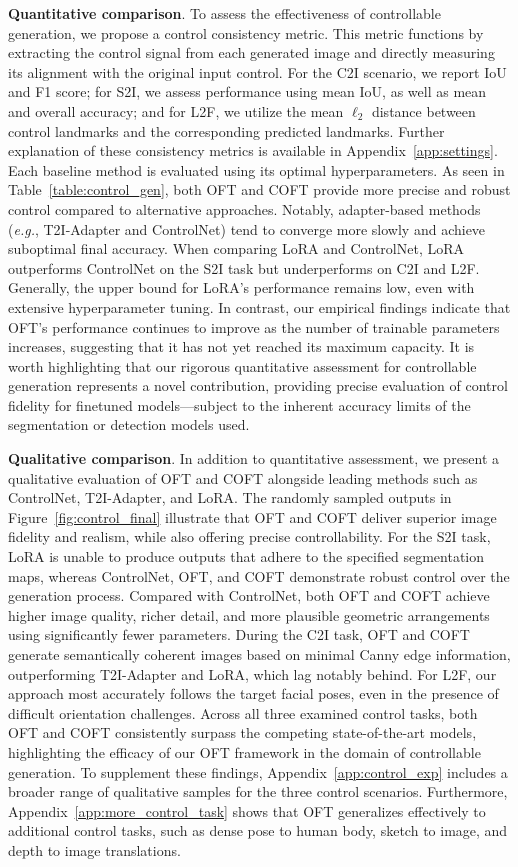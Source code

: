 {\textbf{Quantitative comparison}. To assess the effectiveness of controllable generation, we propose a control consistency metric. This metric functions by extracting the control signal from each generated image and directly measuring its alignment with the original input control. For the C2I scenario, we report IoU and F1 score; for S2I, we assess performance using mean IoU, as well as mean and overall accuracy; and for L2F, we utilize the mean $\ell_2$ distance between control landmarks and the corresponding predicted landmarks. Further explanation of these consistency metrics is available in Appendix~\ref{app:settings}. Each baseline method is evaluated using its optimal hyperparameters. As seen in Table~\ref{table:control_gen}, both OFT and COFT provide more precise and robust control compared to alternative approaches. Notably, adapter-based methods (\emph{e.g.}, T2I-Adapter and ControlNet) tend to converge more slowly and achieve suboptimal final accuracy. When comparing LoRA and ControlNet, LoRA outperforms ControlNet on the S2I task but underperforms on C2I and L2F. Generally, the upper bound for LoRA’s performance remains low, even with extensive hyperparameter tuning. In contrast, our empirical findings indicate that OFT’s performance continues to improve as the number of trainable parameters increases, suggesting that it has not yet reached its maximum capacity. It is worth highlighting that our rigorous quantitative assessment for controllable generation represents a novel contribution, providing precise evaluation of control fidelity for finetuned models—subject to the inherent accuracy limits of the segmentation or detection models used.

\textbf{Qualitative comparison}. In addition to quantitative assessment, we present a qualitative evaluation of OFT and COFT alongside leading methods such as ControlNet, T2I-Adapter, and LoRA. The randomly sampled outputs in Figure~\ref{fig:control_final} illustrate that OFT and COFT deliver superior image fidelity and realism, while also offering precise controllability. For the S2I task, LoRA is unable to produce outputs that adhere to the specified segmentation maps, whereas ControlNet, OFT, and COFT demonstrate robust control over the generation process. Compared with ControlNet, both OFT and COFT achieve higher image quality, richer detail, and more plausible geometric arrangements using significantly fewer parameters. During the C2I task, OFT and COFT generate semantically coherent images based on minimal Canny edge information, outperforming T2I-Adapter and LoRA, which lag notably behind. For L2F, our approach most accurately follows the target facial poses, even in the presence of difficult orientation challenges. Across all three examined control tasks, both OFT and COFT consistently surpass the competing state-of-the-art models, highlighting the efficacy of our OFT framework in the domain of controllable generation. To supplement these findings, Appendix~\ref{app:control_exp} includes a broader range of qualitative samples for the three control scenarios. Furthermore, Appendix~\ref{app:more_control_task} shows that OFT generalizes effectively to additional control tasks, such as dense pose to human body, sketch to image, and depth to image translations.

}
